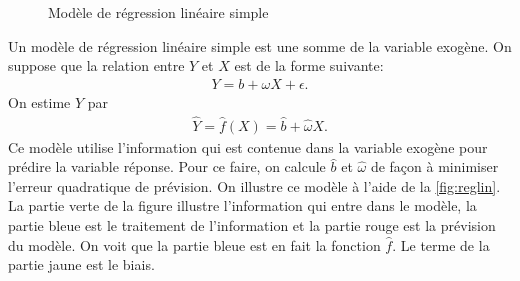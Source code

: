 \begin{figure}[h]
\centering
\caption{\label{fig:reglin}Modèle de régression linéaire simple}
\end{figure}

Un modèle de régression linéaire simple est une somme de la variable exogène. On suppose que la relation entre $Y$ et $X$ est de la forme suivante:
\begin{align*}
Y = b+\omega X + \epsilon.
\end{align*}
On estime $Y$ par
\begin{align*}
\hat{Y} = \hat{f} (X) = \hat{b}+\hat{\omega} X.
\end{align*}
Ce modèle utilise l'information qui est contenue dans la variable exogène pour prédire la variable réponse. Pour ce faire, on calcule $\hat{b}$ et $\hat{\omega}$ de façon à minimiser l'erreur quadratique de prévision.  
On illustre ce modèle à l'aide 
de la \autoref{fig:reglin}. La partie verte de la figure illustre l'information qui entre dans le modèle, la partie bleue est le traitement de l'information et la partie rouge est la prévision du modèle. On voit que la partie bleue est en fait la fonction $\hat{f}$. Le terme de la partie jaune est le biais. 

